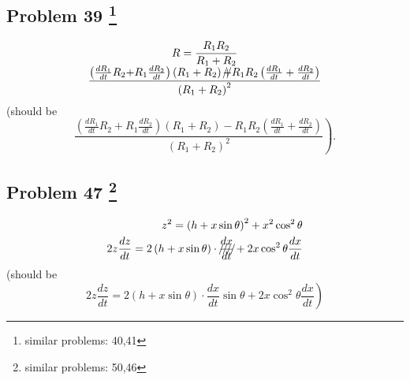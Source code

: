 \documentclass[10pt]{article} %
\begin{document}
\subsection*{Problem 39 \footnote{similar problems: 40,41}}
\begin{equation*}
  \begin{array}[]{c}
    \displaystyle R=\frac{R_1R_2}{R_1+R_2}\\
    \mbox{{$\displaystyle \frac{\left( \frac{dR_1}{dt}R_2\mbox{${+}$}R_1\frac{dR_2}{dt} \right)\left( R_1+R_2 \right)
    \mbox{\xout{$+$}}
    R_1R_2\left( \frac{dR_1}{dt}+\frac{dR_2}{dt} \right)}{\left( R_1+R_2 \right)^2}$}}
  \end{array}
\end{equation*}
  (should be
  \begin{equation*}
    \left.\frac{\left( \frac{dR_1}{dt}R_2\mbox{${+}$}R_1\frac{dR_2}{dt} \right)\left( R_1+R_2 \right)
    -
    R_1R_2\left( \frac{dR_1}{dt}+\frac{dR_2}{dt} \right)}{\left( R_1+R_2 \right)^2}\right).
  \end{equation*}
  \subsection*{Problem 47 \footnote{similar problems: 50,46}}
\begin{align*}
  z^2=\left( h+x\sin\theta \right)^2+x^2\cos^2\theta\\
  2z\frac{dz}{dt}=2\left( h+x\sin\theta \right)\cdot\mbox{\xout{$\displaystyle\frac{dx}{dt}$}}+
  2x\cos^2\theta\frac{dx}{dt}
\end{align*}
(should be\begin{equation*}
  \left.
  2z\frac{dz}{dt}=2\left( h+x\sin\theta \right)\cdot
  \mbox{{$\displaystyle\frac{dx}{dt}$}}\sin\theta
  +
  2x\cos^2\theta\frac{dx}{dt}
  \right)
\end{equation*}
\end{document}

